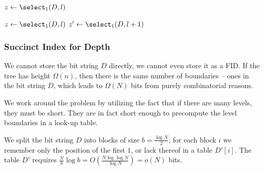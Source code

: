 \begin{algorithm}
\begin{algorithmic}
	\State $z \gets \select_1(D, l)$ 
	\State {}
\EndFunction
\end{algorithmic}
\end{algorithm}

\begin{algorithm}
\begin{algorithmic}
	\State $z \gets \select_1(D, l)$ 
	\State $z' \gets \select_1(D, l + 1)$ 
	\State {}
\EndFunction
\end{algorithmic}
\end{algorithm}

\begin{algorithm}
\begin{algorithmic}
	\State {}
\EndFunction
\end{algorithmic}
\end{algorithm}

\subsubsection{Succinct Index for Depth}\label{ss:louds-depth}

We cannot store the bit string $D$ directly, we cannot even store it as a FID.
If the tree has height $\Omega(n)$, then there is the same number of boundaries -- ones in the bit string $D$, which leads to $\Omega(N)$ bits from purely combinatorial reasons.

We work around the problem by utilizing the fact that if there are many levels, they must be short.
They are in fact short enough to precompute the level boundaries in a look-up table.

We split the bit string $D$ into blocks of size $b = \frac{\log N}{2}$; for each block $i$ we remember only the position of the first $1$, or lack thereof in a table $D'[i]$.
The table $D'$ requires $\frac{N}{b} \log b = O\left(\frac{N \log\log N}{\log N}\right) = o(N)$ bits.

